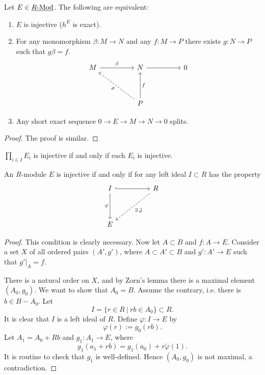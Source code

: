 \newpage

\begin{theorem*}
	Let \( E \in \underline{R\text{-}\mathrm{Mod}} \). The following are equivalent:
	\begin{enumerate}
		\item \( E \) is injective (\( h^E \) is exact).
		\item For any monomorphism \( \beta: M \to N \) and any \( f: M \to P \) there exists \( g: N \to P \) such that \( g \beta = f \).
			  \[
				  \begin{tikzcd}
					  M && N && 0 \\
					  \\
					  && P
					  \arrow["\beta", from=1-1, to=1-3]
					  \arrow[from=1-3, to=1-5]
					  \arrow["\sigma", dashed, from=3-3, to=1-1]
					  \arrow["f"', from=3-3, to=1-3]
				  \end{tikzcd}
			  \]
		\item Any short exact sequence \( 0 \to E \to M \to N \to 0 \) splits.
	\end{enumerate}
\end{theorem*}
\begin{proof}
	The proof is similar.
\end{proof}

\begin{proposition*}
	\( \prod\limits_{i \in I} E_i \) is injective if and only if each \( E_i \) is injective.
\end{proposition*}

\begin{theorem*}
	An \( R \)-module \( E \) is injective if and only if for any left ideal \( I \subset R \) has the property
	\[
		\begin{tikzcd}
			I && R \\
			\\
			E
			\arrow[hook, from=1-1, to=1-3]
			\arrow["\varphi"', from=1-1, to=3-1]
			\arrow["{\exists\,\tilde{\varphi}}", dashed, from=1-3, to=3-1]
		\end{tikzcd}
	\]
\end{theorem*}
\begin{proof}
	This condition is clearly necessary. Now let \( A \subset B \) and \( f: A \to E \). Consider a set \( X \) of all ordered pairs \( (A', g') \), where \( A \subset A' \subset B \) and \( g': A' \to E \) such that \( g' \big|_A = f \).

	\vspace*{1mm}

	There is a natural order on \( X \), and by Zorn's lemma there is a maximal element \( (A_0, g_0) \). We want to show that \( A_0 = B \). Assume the contrary, i.e. there is \( b \in B \minus A_0 \). Let
	\[I = \{r \in R ~|~ rb \in A_0\} \subset R.\]
	It is clear that \( I \) is a left ideal of \( R \). Define \( \varphi: I \to E \) by
	\[\varphi(r) := g_0(rb).\]
	Let \( A_1 = A_0 + R b \) and \( g_1: A_1 \to E \), where
	\[g_1(a_1 + rb) = g_1(a_0) + r \tilde{\varphi}(1).\]
	It is routine to check that \( g_1 \) is well-defined. Hence \( (A_0, g_0) \) is not maximal, a contradiction.
\end{proof}

